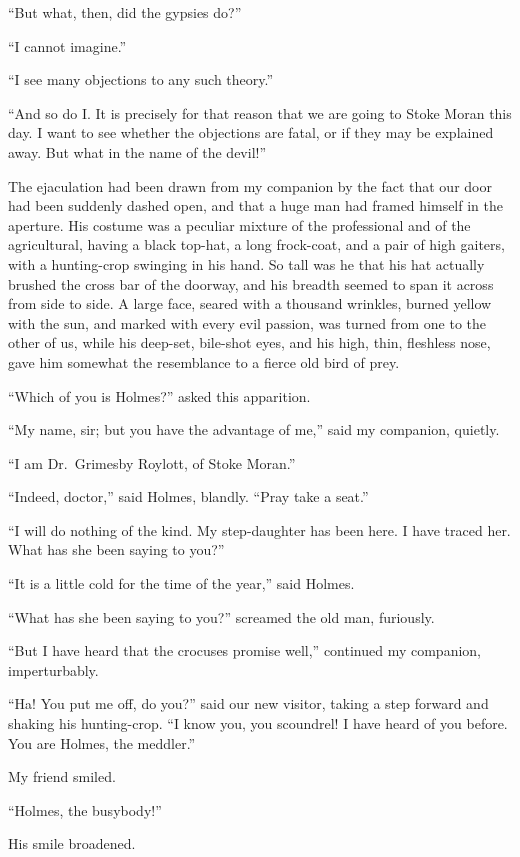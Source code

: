 “But what, then, did the gypsies do?”

“I cannot imagine.”

“I see many objections to any such theory.”

“And so do I. It is precisely for that reason that we are
going to Stoke Moran this day. I want to see whether the
objections are fatal, or if they may be explained away. But
what in the name of the devil!”

The ejaculation had been drawn from my companion by
the fact that our door had been suddenly dashed open, and
that a huge man had framed himself in the aperture. His
costume was a peculiar mixture of the professional and of the
agricultural, having a black top-hat, a long frock-coat, and a
pair of high gaiters, with a hunting-crop swinging in his hand.
So tall was he that his hat actually brushed the cross bar of
the doorway, and his breadth seemed to span it across from
side to side. A large face, seared with a thousand wrinkles,
burned yellow with the sun, and marked with every evil passion,
was turned from one to the other of us, while his deep-set,
bile-shot eyes, and his high, thin, fleshless nose, gave him
somewhat the resemblance to a fierce old bird of prey.

“Which of you is Holmes?” asked this apparition.

“My name, sir; but you have the advantage of me,” said
my companion, quietly.

“I am Dr.\ Grimesby Roylott, of Stoke Moran.”

“Indeed, doctor,” said Holmes, blandly. “Pray take a
seat.”

“I will do nothing of the kind. My step-daughter has been
here. I have traced her. What has she been saying to you?”

“It is a little cold for the time of the year,” said Holmes.

“What has she been saying to you?” screamed the old man,
furiously.

“But I have heard that the crocuses promise well,” continued
my companion, imperturbably.

“Ha! You put me off, do you?” said our new visitor,
taking a step forward and shaking his hunting-crop. “I
know you, you scoundrel! I have heard of you before. You
are Holmes, the meddler.”

My friend smiled.

“Holmes, the busybody!”

His smile broadened.

